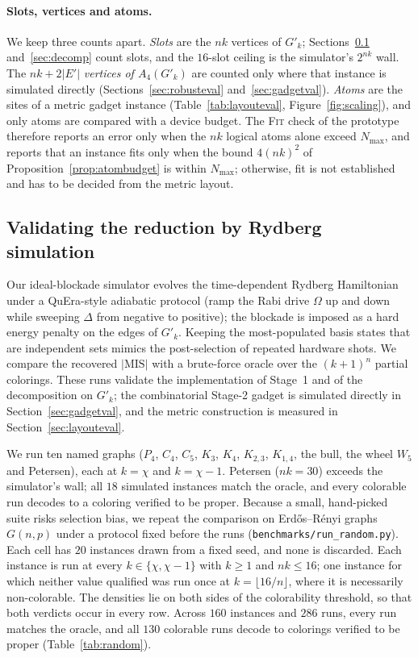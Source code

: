 \documentclass[a4paper,fleqn]{cas-sc}
\newcommand{\MIS}{\mathrm{MIS}}
\newcommand{\Nmax}{N_{\max}}
\newcommand{\rn}[1]{\textup{\textsc{\footnotesize #1}}}
\begin{document}
\paragraph{Slots, vertices and atoms.} We keep three counts apart. \emph{Slots} are
the $nk$ vertices of $G'_k$; Sections~\ref{sec:simval} and~\ref{sec:decomp} count
slots, and the $16$-slot ceiling is the simulator's $2^{nk}$ wall. The
$nk+2|E'|$ \emph{vertices of $A_4(G'_k)$} are counted only where that instance is
simulated directly (Sections~\ref{sec:robusteval} and~\ref{sec:gadgetval}).
\emph{Atoms} are the sites of a metric gadget instance (Table~\ref{tab:layouteval},
Figure~\ref{fig:scaling}), and only atoms are compared with a device budget. The
\rn{Fit} check of the prototype therefore reports an error only when the $nk$ logical
atoms alone exceed $\Nmax$, and reports that an instance fits only when the bound
$4(nk)^2$ of Proposition~\ref{prop:atombudget} is within $\Nmax$; otherwise, fit is
not established and has to be decided from the metric layout.

\subsection{Validating the reduction by Rydberg simulation}
\label{sec:simval}
\label{sec:random}

Our ideal-blockade simulator evolves the time-dependent Rydberg Hamiltonian under a
QuEra-style adiabatic protocol (ramp the Rabi drive $\Omega$ up and down while
sweeping $\Delta$ from negative to positive); the blockade is imposed as a hard energy
penalty on the edges of $G'_k$. Keeping the most-populated basis states that are
independent sets mimics the post-selection of repeated hardware shots. We compare the recovered
$|\MIS|$ with a brute-force oracle over the $(k{+}1)^n$ partial colorings. These runs
validate the implementation of Stage~1 and of the decomposition on $G'_k$; the
combinatorial Stage-2 gadget is simulated directly in Section~\ref{sec:gadgetval},
and the metric construction is measured in Section~\ref{sec:layouteval}.

We run ten named graphs ($P_4$, $C_4$, $C_5$, $K_3$, $K_4$, $K_{2,3}$, $K_{1,4}$, the
bull, the wheel $W_5$ and Petersen), each at $k=\chi$ and $k=\chi-1$. Petersen
($nk=30$) exceeds the simulator's wall; all $18$ simulated instances match the oracle,
and every colorable run decodes to a coloring verified to be proper. Because a small,
hand-picked suite risks selection bias, we repeat the comparison on
Erd\H{o}s--R\'enyi graphs $G(n,p)$ under a protocol fixed before the runs
(\texttt{benchmarks/run\_random.py}). Each cell has $20$ instances drawn from a fixed
seed, and none is discarded. Each instance is run at every $k\in\{\chi,\chi-1\}$ with
$k\ge1$ and $nk\le16$; one instance for which neither value qualified was run once at
$k=\lfloor16/n\rfloor$, where it is necessarily non-colorable. The densities lie on
both sides of the colorability threshold, so that both verdicts occur in every row.
Across $160$ instances and $286$ runs, every run matches the oracle, and all $130$
colorable runs decode to colorings verified to be proper (Table~\ref{tab:random}).
\end{document}
